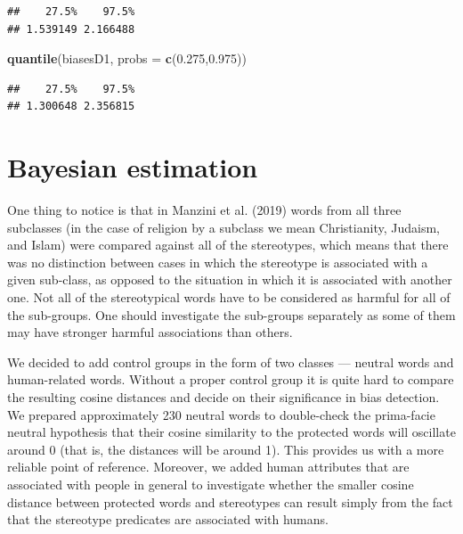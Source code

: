\documentclass[10pt,dvipsnames,enabledeprecatedfontcommands]{scrartcl}
\newenvironment{Shaded}{\begin{snugshade}}{\end{snugshade}}
\newcommand{\KeywordTok}[1]{\textcolor[rgb]{0.13,0.29,0.53}{\textbf{#1}}}
\newcommand{\DataTypeTok}[1]{\textcolor[rgb]{0.13,0.29,0.53}{#1}}
\newcommand{\FloatTok}[1]{\textcolor[rgb]{0.00,0.00,0.81}{#1}}
\newcommand{\NormalTok}[1]{#1}
\begin{document}
\begin{verbatim}
##    27.5%    97.5% 
## 1.539149 2.166488
\end{verbatim}

\begin{Shaded}
\begin{Highlighting}[]
\KeywordTok{quantile}\NormalTok{(biasesD1, }\DataTypeTok{probs =} \KeywordTok{c}\NormalTok{(}\FloatTok{0.275}\NormalTok{,}\FloatTok{0.975}\NormalTok{))}
\end{Highlighting}
\end{Shaded}

\begin{verbatim}
##    27.5%    97.5% 
## 1.300648 2.356815
\end{verbatim}

\normalsize

\section{Bayesian estimation}\label{bayesian-estimation}

One thing to notice is that in Manzini et al. (2019) words from all
three subclasses (in the case of religion by a subclass we mean
Christianity, Judaism, and Islam) were compared against all of the
stereotypes, which means that there was no distinction between cases in
which the stereotype is associated with a given sub-class, as opposed to
the situation in which it is associated with another one. Not all of the
stereotypical words have to be considered as harmful for all of the
sub-groups. One should investigate the sub-groups separately as some of
them may have stronger harmful associations than others.

We decided to add control groups in the form of two classes --- neutral
words and human-related words. Without a proper control group it is
quite hard to compare the resulting cosine distances and decide on their
significance in bias detection. We prepared approximately 230 neutral
words to double-check the prima-facie neutral hypothesis that their
cosine similarity to the protected words will oscillate around 0 (that
is, the distances will be around 1). This provides us with a more
reliable point of reference. Moreover, we added human attributes that
are associated with people in general to investigate whether the smaller
cosine distance between protected words and stereotypes can result
simply from the fact that the stereotype predicates are associated with
humans.
\end{document}
